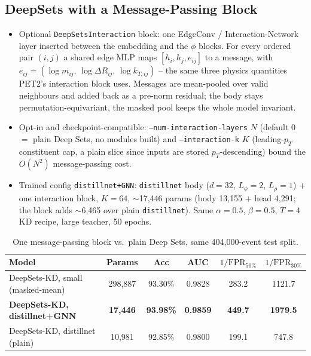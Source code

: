 \subsection{DeepSets with a Message-Passing Block}
\label{sec:deepsets-gnn}

\begin{itemize}
    \item Optional \texttt{DeepSetsInteraction} block: one EdgeConv /
    Interaction-Network layer inserted between the embedding and the $\phi$
    blocks. For every ordered pair $(i,j)$ a shared edge MLP maps
    $[h_i, h_j, e_{ij}]$ to a message, with
    $e_{ij}=(\log m_{ij},\,\log\Delta R_{ij},\,\log k_{T,ij})$ -- the same
    three physics quantities PET2's interaction block uses. Messages are
    mean-pooled over valid neighbours and added back as a pre-norm residual;
    the body stays permutation-equivariant, the masked pool keeps the whole
    model invariant.
    \item Opt-in and checkpoint-compatible: \texttt{--num-interaction-layers}
    $N$ (default 0 $=$ plain Deep Sets, no modules built) and
    \texttt{--interaction-k} $K$ (leading-$p_T$ constituent cap, a plain
    slice since inputs are stored $p_T$-descending) bound the $O(N^2)$
    message-passing cost.
    \item Trained config \texttt{distillnet+GNN}: \texttt{distillnet} body
    ($d{=}32$, $L_\phi{=}2$, $L_\rho{=}1$) $+$ one interaction block, $K{=}64$,
    $\sim$17{,}446 params (body 13{,}155 $+$ head 4{,}291; the block adds
    $\sim$6{,}465 over plain \texttt{distillnet}). Same $\alpha{=}0.5$,
    $\beta{=}0.5$, $T{=}4$ KD recipe, large teacher, 50 epochs.
\end{itemize}

\begin{table}[h]
    \centering
    \small
    \begin{tabular}{lccccc}
        \toprule
        Model & Params & Acc & AUC & $1/\mathrm{FPR}_{50\%}$ & $1/\mathrm{FPR}_{30\%}$ \\
        \midrule
        DeepSets-KD, small (masked-mean)   & 298{,}887 & 93.30\% & 0.9828 & 283.2 & 1121.7 \\
        \textbf{DeepSets-KD, distillnet+GNN} & \textbf{17{,}446} & \textbf{93.98\%} & \textbf{0.9859} & \textbf{449.7} & \textbf{1979.5} \\
        DeepSets-KD, distillnet (plain)    & 10{,}981 & 92.85\% & 0.9800 & 199.1 & 747.8 \\
        \bottomrule
    \end{tabular}
    \caption{One message-passing block vs.\ plain Deep Sets, same
    404{,}000-event test split.}
    \label{tab:deepsets-gnn-result}
\end{table}

